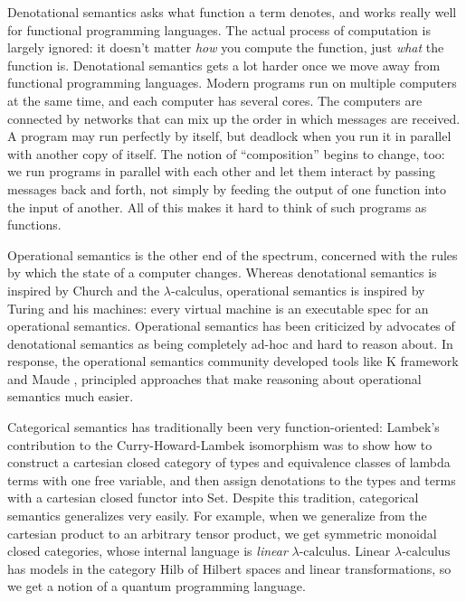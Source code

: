 \documentclass[submission,copyright,creativecommons]{eptcs}
\newcommand{\lac}{$\lambda\mbox{-calculus}$\xspace}
\begin{document}
Denotational semantics asks what function a term denotes, and works really well for functional programming languages.  The actual process of computation is largely ignored: it doesn't matter {\em how} you compute the function, just {\em what} the function is.  Denotational semantics gets a lot harder once we move away from functional programming languages.  Modern programs run on multiple computers at the same time, and each computer has several cores. The computers are connected by networks that can mix up the order in which messages are received.  A program may run perfectly by itself, but deadlock when you run it in parallel with another copy of itself.  The notion of ``composition'' begins to change, too: we run programs in parallel with each other and let them interact by passing messages back and forth, not simply by feeding the output of one function into the input of another.  All of this makes it hard to think of such programs as functions.

Operational semantics is the other end of the spectrum, concerned with the rules by which the state of a computer changes.  Whereas denotational semantics is inspired by Church and the \lac, operational semantics is inspired by Turing and his machines: every virtual machine is an executable spec for an operational semantics.  Operational semantics has been criticized by advocates of denotational semantics as being completely ad-hoc and hard to reason about.  In response, the operational semantics community developed tools like K framework \cite{kframework} and Maude \cite{Maude}, principled approaches that make reasoning about operational semantics much easier.

Categorical semantics has traditionally been very function-oriented: Lambek's contribution \cite{Lambek} to the Curry-Howard-Lambek isomorphism was to show how to construct a cartesian closed category of types and equivalence classes of lambda terms with one free variable, and then assign denotations to the types and terms with a cartesian closed functor into Set.  Despite this tradition, categorical semantics generalizes very easily.  For example, when we generalize from the cartesian product to an arbitrary tensor product, we get symmetric monoidal closed categories, whose internal language is {\em linear} \lac.  Linear \lac has models in the category Hilb of Hilbert spaces and linear transformations, so we get a notion of a quantum programming language.
\end{document}
